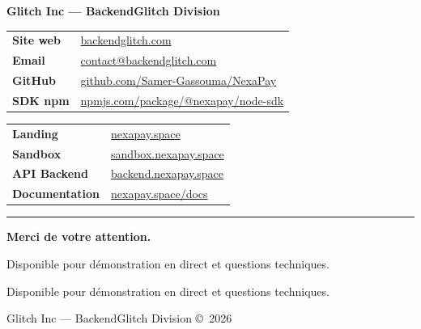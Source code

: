 \documentclass[11pt,a4paper]{article}
\begin{document}
\begin{center}
{\Large\bfseries Glitch Inc --- BackendGlitch Division}

\vspace{0.5cm}
\begin{tabular}{ll}
\textbf{Site web} & \href{https://backendglitch.com}{backendglitch.com} \\
\textbf{Email} & \href{mailto:contact@backendglitch.com}{contact@backendglitch.com} \\
\textbf{GitHub} & \href{https://github.com/Samer-Gassouma/NexaPay}{github.com/Samer-Gassouma/NexaPay} \\
\textbf{SDK npm} & \href{https://www.npmjs.com/package/@nexapay/node-sdk}{npmjs.com/package/@nexapay/node-sdk} \\
\end{tabular}

\vspace{0.8cm}
\begin{tabular}{ll}
\textbf{Landing} & \href{https://nexapay.space}{nexapay.space} \\
\textbf{Sandbox} & \href{https://sandbox.nexapay.space}{sandbox.nexapay.space} \\
\textbf{API Backend} & \href{https://backend.nexapay.space}{backend.nexapay.space} \\
\textbf{Documentation} & \href{https://nexapay.space/docs}{nexapay.space/docs} \\
\end{tabular}

\vspace{1.5cm}
{\color{nexablue}\rule{8cm}{1pt}}

\vspace{0.5cm}
{\large\bfseries\color{nexablue} Merci de votre attention.}

\vspace{0.3cm}
{\normalsize\color{nexagray} Disponible pour d\'emonstration en direct et questions techniques.}

\vspace{0.3cm}
{\normalsize\color{nexagray} Disponible pour d\'emonstration en direct et questions techniques.}

\vspace{0.5cm}
{\small\color{nexagray} Glitch Inc --- BackendGlitch Division \copyright\ 2026}
\end{center}
\end{document}
